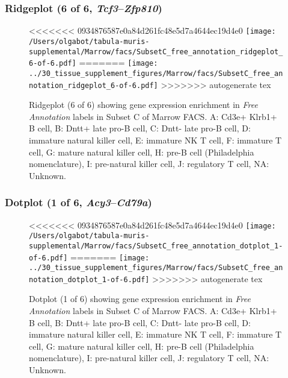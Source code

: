 \subsubsection{Ridgeplot (6 of 6, \emph{Tcf3}--\emph{Zfp810})}
\begin{figure}[h]
\centering
<<<<<<< 0934876587e0a84d261fc48e5d7a4644ec19d4e0
\texttt{[image: /Users/olgabot/tabula-muris-supplemental/Marrow/facs/SubsetC\_free\_annotation\_ridgeplot\_6-of-6.pdf]}
=======
\texttt{[image: ../30\_tissue\_supplement\_figures/Marrow/facs/SubsetC\_free\_annotation\_ridgeplot\_6-of-6.pdf]}
>>>>>>> autogenerate tex

\caption{ Ridgeplot (6 of 6)  showing gene expression enrichment in \emph{Free Annotation} labels in Subset C of Marrow FACS. A: Cd3e+ Klrb1+ B cell, B: Dntt+ late pro-B cell, C: Dntt- late pro-B cell, D: immature natural killer cell, E: immature NK T cell, F: immature T cell, G: mature natural killer cell, H: pre-B cell (Philadelphia nomenclature), I: pre-natural killer cell, J: regulatory T cell, NA: Unknown.}
\end{figure}


\clearpage

\subsubsection{Dotplot (1 of 6, \emph{Acy3}--\emph{Cd79a})}
\begin{figure}[h]
\centering
<<<<<<< 0934876587e0a84d261fc48e5d7a4644ec19d4e0
\texttt{[image: /Users/olgabot/tabula-muris-supplemental/Marrow/facs/SubsetC\_free\_annotation\_dotplot\_1-of-6.pdf]}
=======
\texttt{[image: ../30\_tissue\_supplement\_figures/Marrow/facs/SubsetC\_free\_annotation\_dotplot\_1-of-6.pdf]}
>>>>>>> autogenerate tex

\caption{ Dotplot (1 of 6)  showing gene expression enrichment in \emph{Free Annotation} labels in Subset C of Marrow FACS. A: Cd3e+ Klrb1+ B cell, B: Dntt+ late pro-B cell, C: Dntt- late pro-B cell, D: immature natural killer cell, E: immature NK T cell, F: immature T cell, G: mature natural killer cell, H: pre-B cell (Philadelphia nomenclature), I: pre-natural killer cell, J: regulatory T cell, NA: Unknown.}
\end{figure}


\clearpage

